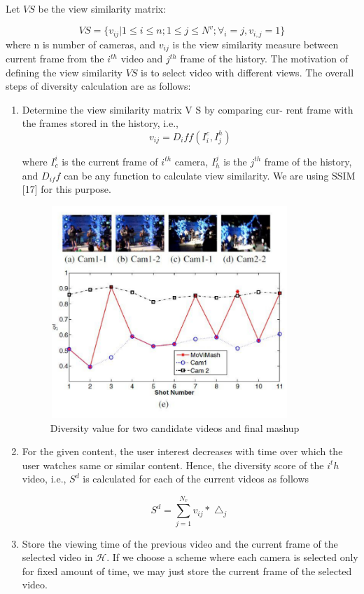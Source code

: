 \documentclass{sig-alternate}
\begin{document}
Let $V S$ be the view similarity matrix:

$$ V S = \{ v_{ij}|1 \leqslant i \leqslant n; 1 \leqslant j \leqslant N^v;  \forall_i=j,v_{i,j}  =1 \}  $$
 where n is number of cameras, and $v_{ij}$ is the view similarity
measure between current frame from the $i^{th}$ video and $j^{th}$ frame
of the history. The motivation of defining the view similarity $V S$ is
to select video with different views. The overall steps of diversity
calculation are as follows:


\begin{enumerate}
    \item  Determine the view similarity matrix V S by comparing cur-
rent frame with the frames stored in the history, i.e.,
  $$v_{ij}=D_iff(I^c_i,I^h_j)$$

  where $I^i_c$ is the current frame of $i^{th}$ camera, $I^j_h$ is the $j^{th}$ frame of the history, and $D_{if} f$ can be any function to calculate view similarity. We are using SSIM [17] for this purpose.

  
  \begin{figure}
\includegraphics[width=9cm, height=8cm]{video_3.pdf}
   \caption{ Diversity value for two candidate videos and final
mashup}

\end{figure}

  \item For the given content, the user interest decreases with time
over which the user watches same or similar content. Hence,
the diversity score of the $i^th$ video, i.e., $S^d$ is calculated for
each of the current videos as follows

  $$ S^d = \sum_{j=1}^{N_v}v_{ij}* \bigtriangleup_j $$

\item Store the viewing time of the previous video and the current
frame of the selected video in $\mathcal{H}$. If we choose a scheme
where each camera is selected only for fixed amount of time,
we may just store the current frame of the selected video.
\end{enumerate}
\end{document}
